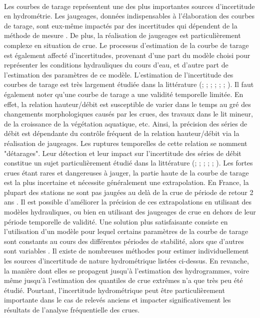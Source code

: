 \documentclass[11pt]{article}
\begin{document}
	\paragraph{} Les courbes de tarage représentent une des plus importantes sources d'incertitude en hydrométrie. Les jaugeages, données indispensables à l'élaboration des courbes de tarage, sont eux-même impactés par des incertitudes qui dépendent de la méthode de mesure \citep{lecoz_quantification_2014}. De plus, la réalisation de jaugeages est particulièrement complexe en situation de crue. Le processus d'estimation de la courbe de tarage est également affecté d'incertitudes, provenant d'une part du modèle choisi pour représenter les conditions hydrauliques du cours d'eau, et d'autre part de l'estimation des paramètres de ce modèle. L'estimation de l'incertitude des courbes de tarage est très largement étudiée dans la littérature (\citet{petersen-overleir_bayesian_2009}; \citet{juston_rating_2014}; \citet{le_coz_combining_2014}; \citet{morlot_dynamic_2014}; \citet{coxon_novel_2015}; \citet{mcmillan_rating_2015}; \citet{mansanarez_rapid_2019}). Il faut également noter qu'une courbe de tarage a une validité temporelle limitée. En effet, la relation hauteur/débit est susceptible de varier dans le temps au gré des changements morphologiques causés par les crues, des travaux dans le lit mineur, de la croissance de la végétation aquatique, etc. Ainsi, la précision des séries de débit est dépendante du contrôle fréquent de la relation hauteur/débit via la réalisation de jaugeages. Les ruptures temporelles de cette relation se nomment "détarages". Leur détection et leur impact sur l'incertitude des séries de débit constitue un sujet particulièrement étudié dans la littérature (\citet{mcmillan_impacts_2010}; \citet{westerberg_stage-discharge_2011}; \citet{guerrero_temporal_2012}; \citet{morlot_dynamic_2014}; \citet{lapuszek_methods_2015};  \citet{darienzo_detection_2021}). Les fortes crues étant rares et dangereuses à jauger, la partie haute de la courbe de tarage est la plus incertaine et nécessite généralement une extrapolation. En France, la plupart des stations ne sont pas jaugées au delà de la crue de période de retour 2 ans \citep{lang_extrapolation_2010}. Il est possible d'améliorer la précision de ces extrapolations en utilisant des modèles hydrauliques, ou bien en utilisant des jaugeages de crue en dehors de leur période temporelle de validité. Une solution plus satisfaisante consiste en l'utilisation d'un modèle pour lequel certains paramètres de la courbe de tarage sont constants au cours des différentes périodes de stabilité, alors que d'autres sont variables \citep{mansanarez_shift_2019}. Il existe de nombreuses méthodes pour estimer individuellement les sources d'incertitude de nature hydrométrique listées ci-dessus. En revanche, la manière dont elles se propagent jusqu'à l'estimation des hydrogrammes, voire même jusqu'à l'estimation des quantiles de crue extrêmes n'a que très peu été étudié. Pourtant, l'incertitude hydrométrique peut être particulièrement importante dans le cas de relevés anciens et impacter significativement les résultats de l'analyse fréquentielle des crues.
	
\end{document}
